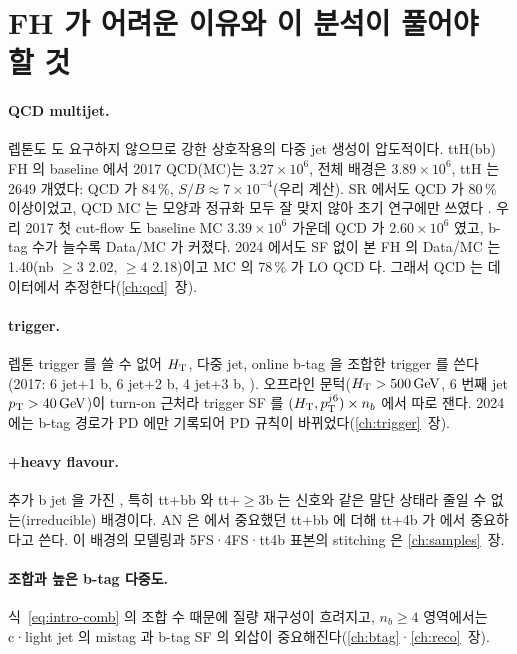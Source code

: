 \section{FH 가 어려운 이유와 이 분석이 풀어야 할 것}\label{sec:intro-challenges}

\paragraph{QCD multijet.} 렙톤도 \MET 도 요구하지 않으므로 강한 상호작용의 다중 jet 생성이 압도적이다. ttH(bb) FH 의 baseline 에서 2017 QCD(MC)는
$3.27\times10^{6}$, 전체 배경은 $3.89\times10^{6}$, ttH 는 2649 개였다: QCD 가 84\,\%, $S/B\approx7\times10^{-4}$(우리 계산).
SR 에서도 QCD 가 80\,\% 이상이었고, QCD MC 는 모양과 정규화 모두 잘 맞지 않아 초기 연구에만 쓰였다
. 우리 2017 첫 cut-flow 도 baseline MC $3.39\times10^{6}$ 가운데 QCD 가 $2.60\times10^{6}$ 였고, b-tag 수가 늘수록
Data/MC 가 커졌다. 2024 에서도 SF 없이 본 FH 의 Data/MC 는 1.40(nb $\geq3$ 2.02, $\geq4$ 2.18)이고 MC 의 78\,\% 가
LO QCD 다. 그래서 QCD 는 데이터에서 추정한다(\ref{ch:qcd}~장).

\paragraph{trigger.} 렙톤 trigger 를 쓸 수 없어 $H_{\mathrm{T}}$, 다중 jet, online b-tag 을 조합한 trigger 를 쓴다(2017: 6 jet+1 b, 6 jet+2 b, 4 jet+3 b,
). 오프라인 문턱($H_{\mathrm{T}}>500\,\mathrm{GeV}$, 6 번째 jet $p_{\mathrm{T}}>40\,\mathrm{GeV}$)이 turn-on 근처라 trigger SF 를 $(H_{\mathrm{T}}, p_{\mathrm T}^{j6})\times n_b$
에서 따로 잰다. 2024 에는 b-tag 경로가  PD 에만 기록되어 PD 규칙이 바뀌었다(\ref{ch:trigger}~장).

\paragraph{\ttbar+heavy flavour.} 추가 b jet 을 가진 \ttbar, 특히 tt+bb 와 tt+$\geq$3b 는 신호와 같은 말단 상태라 줄일 수 없는(irreducible) 배경이다.
AN 은 \ttH 에서 중요했던 tt+bb 에 더해 tt+4b 가 \ttHH 에서 중요하다고 쓴다. 이 배경의 모델링과 5FS·4FS·tt4b 표본의
stitching 은 \ref{ch:samples}~장.

\paragraph{조합과 높은 b-tag 다중도.} 식~\eqref{eq:intro-comb} 의 조합 수 때문에 질량 재구성이 흐려지고, $n_b\geq4$ 영역에서는 c·light jet 의 mistag 과
b-tag SF 의 외삽이 중요해진다(\ref{ch:btag}·\ref{ch:reco}~장).

